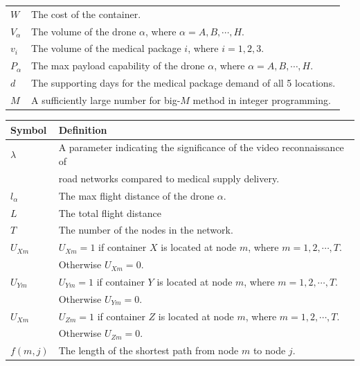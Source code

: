 \documentclass{mcmthesis}
\begin{document}
\begin{tabular}{ll}
	 $W$& The cost of the container.\\
	
	 $V_\alpha$& The volume of the drone $\alpha$, where $\alpha=A,B,\cdots,H$.\\
	
	 $v_i$& The volume of the medical package $i$, where $i=1,2,3$.\\
	
	 $P_\alpha$& The max payload capability of the drone $\alpha$, where $\alpha=A,B,\cdots,H$.\\
	
	 $d$& The supporting days for the medical package demand of all 5 locations.\\
	
	 $M$& A sufficiently large number for big-$M$ method in integer programming.\\ 
	\hline
\end{tabular}


\begin{tabular}{ll}
	\hline
	Symbol&  Definition\\
	\hline	 
	 $\lambda$& A parameter indicating the significance of the video reconnaissance of\\
	 & road networks compared to medical supply delivery. \\
	 
	 $l_\alpha$& The max flight distance of the drone $\alpha$.\\
	 
	 $L$& The total flight distance \\
	 
	 $T$& The number of the nodes in the network.\\
	 
	 $U_{Xm}$& $U_{Xm}=1$ if container $X$ is located at node $m$, where $m=1,2,\cdots,T$.\\ & Otherwise $U_{Xm}=0$.\\
	 
	 $U_{Ym}$& $U_{Ym}=1$ if container $Y$ is located at node $m$, where $m=1,2,\cdots,T$.\\ &Otherwise $U_{Ym}=0$.\\
	 
	 $U_{Xm}$& $U_{Zm}=1$ if container $Z$ is located at node $m$, where $m=1,2,\cdots,T$.\\ &Otherwise $U_{Zm}=0$.\\
	 
	$f(m,j)$& The length of the shortest path from node $m$ to node $j$.\\
	\hline
\end{tabular}
\end{document}
